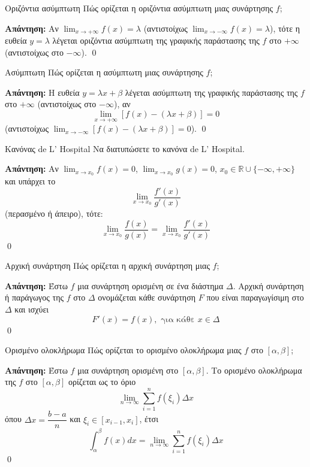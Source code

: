 \documentclass[a4paper, 12pt]{article}
\renewenvironment{proof}[1][\textbf{Απάντηση}]{%
  \par\noindent\textbf{#1:} \rmfamily}{\qed\par}
\begin{document}
\begin{theorem}{Οριζόντια ασύμπτωτη}
  Πώς ορίζεται η οριζόντια ασύμπτωτη μιας συνάρτησης $f$;
\end{theorem}
\begin{proof}
  Αν $\lim_{x \to +\infty} f ( x) = λ$ (αντιστοίχως $\lim_{x \to -\infty} f ( x) = λ$), τότε η ευθεία $y = λ$ λέγεται οριζόντια ασύμπτωτη της γραφικής παράστασης της $f$ στο $+\infty$ (αντιστοίχως στο $−\infty$).
\end{proof}

\begin{theorem}{Ασύμπτωτη}
  Πώς ορίζεται η ασύμπτωτη μιας συνάρτησης $f$;
\end{theorem}
\begin{proof}
  Η ευθεία $y = λx + β$ λέγεται ασύμπτωτη της γραφικής παράστασης της $f$ στο $+\infty$ (αντιστοίχως στο $−\infty$), αν
  $$\lim_{x \to +\infty} [ f ( x) − (λ x + β )] = 0$$
  (αντιστοίχως $\lim_{x \to -\infty} [ f ( x) − (λ x + β )] = 0$).
\end{proof}

\begin{theorem}{Κανόνας de L' Hospital}
  Να διατυπώσετε το κανόνα de L' Hospital.
\end{theorem}
\begin{proof}
  Αν $\lim_{x \to x_0} f ( x) = 0$, $\lim_{x \to x_0} g ( x) = 0$, $x_0 \in \mathbb{R} \cup \{−\infty, + \infty\}$ και υπάρχει το
  $$\lim_{x \to x_0} \dfrac{f'( x)}{g' ( x)}$$
  (περασμένο ή άπειρο), τότε:
  $$\lim_{x \to x_0} \dfrac{f ( x)}{g ( x)} = \lim_{x \to x_0} \dfrac{f' ( x)}{g' ( x)}$$
\end{proof}

\begin{theorem}{Αρχική συνάρτηση}
  Πώς ορίζεται η αρχική συνάρτηση μιας $f$;
\end{theorem}
\begin{proof}
  Έστω $f$ μια συνάρτηση ορισμένη σε ένα διάστημα $Δ$. Αρχική συνάρτηση ή παράγωγος της $f$ στο $Δ$ ονομάζεται κάθε συνάρτηση $F$ που είναι παραγωγίσιμη στο $Δ$ και ισχύει
  $$F ′ (x) = f(x), \text{ για κάθε } x \in Δ$$
\end{proof}

\begin{theorem}{Ορισμένο ολοκλήρωμα}
  Πώς ορίζεται το ορισμένο ολοκλήρωμα μιας $f$ στο $[α, β]$;
\end{theorem}
\begin{proof}
  Έστω $f$ μια συνάρτηση ορισμένη στο $[α, β]$. Το ορισμένο ολοκλήρωμα της $f$ στο $[α, β]$ ορίζεται ως το όριο
  $$\lim_{n \to \infty} \sum_{i=1}^{n} f ( ξ_i ) Δx$$
  όπου $Δx = \dfrac{b - a}{n}$ και $ξ_i \in [x_{i-1}, x_i]$, έτσι
  $$\int_{α}^{β} f ( x) dx = \lim_{n \to \infty} \sum_{i=1}^{n} f ( ξ_i ) Δx$$
\end{proof}
\end{document}
